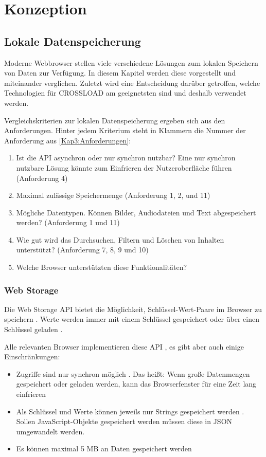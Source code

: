 \chapter{Konzeption}
\label{Kap4}

\section{Lokale Datenspeicherung}
Moderne Webbrowser stellen viele verschiedene Lösungen zum lokalen Speichern von Daten zur Verfügung. In diesem Kapitel werden diese vorgestellt und miteinander verglichen. Zuletzt wird eine Entscheidung darüber getroffen, welche Technologien für CROSSLOAD am geeignetsten sind und deshalb verwendet werden.

Vergleichskriterien zur lokalen Datenspeicherung ergeben sich aus den Anforderungen. Hinter jedem Kriterium steht in Klammern die Nummer der Anforderung aus \autoref{Kap3:Anforderungen}:
\begin{enumerate}
	\item Ist die \ac{API} asynchron oder nur synchron nutzbar? Eine nur synchron nutzbare Lösung könnte zum Einfrieren der Nutzeroberfläche führen (Anforderung 4)
	\item Maximal zulässige Speichermenge (Anforderung 1, 2, und 11)
	\item Mögliche Datentypen. Können Bilder, Audiodateien und Text abgespeichert werden? (Anforderung 1 und 11)
	\item Wie gut wird das Durchsuchen, Filtern und Löschen von Inhalten unterstützt? (Anforderung 7, 8, 9 und 10)
	\item Welche Browser unterstützten diese Funktionalitäten?
\end{enumerate}

\subsection{Web Storage}
Die Web Storage \ac{API} bietet die Möglichkeit, Schlüssel-Wert-Paare im Browser zu speichern \autocite{mdn-web-storage}. Werte werden immer mit einem Schlüssel gespeichert oder über einen Schlüssel geladen \autocite{mdn-web-storage}.

Alle relevanten Browser implementieren diese \ac{API} \autocite{mdn-web-storage}, es gibt aber auch einige Einschränkungen:
\begin{itemize}
	\item Zugriffe sind nur synchron möglich \autocite{Hajian2019}. Das heißt: Wenn große Datenmengen gespeichert oder geladen werden, kann das Browserfenster für eine Zeit lang einfrieren
	\item Als Schlüssel und Werte können jeweils nur Strings gespeichert werden \autocite{Hajian2019}. Sollen JavaScript-Objekte gespeichert werden müssen diese in JSON umgewandelt werden.
	\item Es können maximal 5 \ac{MB} an Daten gespeichert werden \autocite{mdn-web-storage}
\end{itemize}

